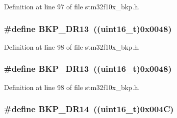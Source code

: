 Definition at line 97 of file stm32f10x\+\_\+bkp.\+h.

\subsubsection[{\texorpdfstring{B\+K\+P\+\_\+\+D\+R13}{BKP_DR13}}]{\setlength{\rightskip}{0pt plus 5cm}\#define B\+K\+P\+\_\+\+D\+R13~(({\bf uint16\+\_\+t})0x0048)}\hypertarget{group___data___backup___register_ga35202788ca784ad00d2ee11d54990c86}{}\label{group___data___backup___register_ga35202788ca784ad00d2ee11d54990c86}


Definition at line 98 of file stm32f10x\+\_\+bkp.\+h.

\subsubsection[{\texorpdfstring{B\+K\+P\+\_\+\+D\+R13}{BKP_DR13}}]{\setlength{\rightskip}{0pt plus 5cm}\#define B\+K\+P\+\_\+\+D\+R13~(({\bf uint16\+\_\+t})0x0048)}\hypertarget{group___data___backup___register_ga35202788ca784ad00d2ee11d54990c86}{}\label{group___data___backup___register_ga35202788ca784ad00d2ee11d54990c86}


Definition at line 98 of file stm32f10x\+\_\+bkp.\+h.

\subsubsection[{\texorpdfstring{B\+K\+P\+\_\+\+D\+R14}{BKP_DR14}}]{\setlength{\rightskip}{0pt plus 5cm}\#define B\+K\+P\+\_\+\+D\+R14~(({\bf uint16\+\_\+t})0x004\+C)}\hypertarget{group___data___backup___register_ga47211005caa15e93e138691ba9bf2fa1}{}\label{group___data___backup___register_ga47211005caa15e93e138691ba9bf2fa1}


